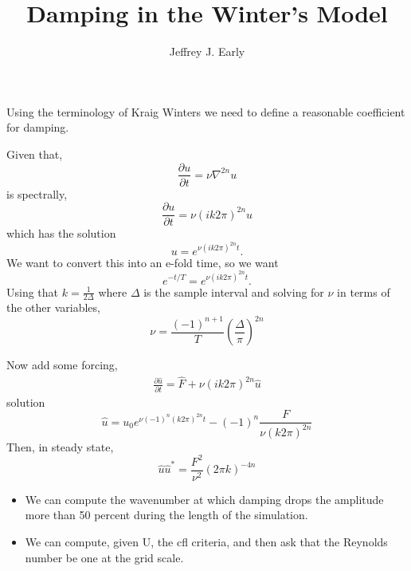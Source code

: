 \documentclass[11pt, oneside]{article}   	%
\title{Damping in the Winter's Model}
\author{Jeffrey J. Early}
\begin{document}
\maketitle
Using the terminology of Kraig Winters we need to define a reasonable coefficient for damping.

Given that,
\begin{equation}
\frac{\partial u}{\partial t} = \nu \nabla^{2n} u
\end{equation}
is spectrally,
\begin{equation}
\frac{\partial u}{\partial t} = \nu (i k 2 \pi)^{2n} u
\end{equation}
which has the solution
\begin{equation}
u = e^{\nu (i k 2 \pi)^{2n} t}.
\end{equation}
We want to convert this into an e-fold time, so we want
\begin{equation}
e^{-t/T}=e^{\nu (i k 2 \pi)^{2n} t}.
\end{equation}
Using that $k=\frac{1}{2\Delta}$ where $\Delta$ is the sample interval and solving for $\nu$ in terms of the other variables,
\begin{equation}
\nu = \frac{(-1)^{n+1}}{T} \left( \frac{\Delta}{\pi} \right)^{2n}
\end{equation}

Now add some forcing,
\begin{align}
\frac{\partial \hat{u}}{\partial t} = \hat{F} +  \nu (i k 2 \pi)^{2n} \hat{u}
\end{align}
solution
\begin{equation}
\hat{u} = u_0 e^{\nu (-1)^n (k 2 \pi)^{2n} t} - (-1)^n \frac{F}{ \nu (k 2 \pi)^{2n}}
\end{equation}
Then, in steady state,
\begin{equation}
\hat{u}\hat{u}^\ast =  \frac{F^2}{ \nu^2 } (2 \pi k )^{-4n}
\end{equation}

\begin{itemize}
\item We can compute the wavenumber at which damping drops the amplitude more than 50 percent during the length of the simulation.
\item We can compute, given U, the cfl criteria, and then ask that the Reynolds number be one at the grid scale.
\end{itemize}
\end{document}
